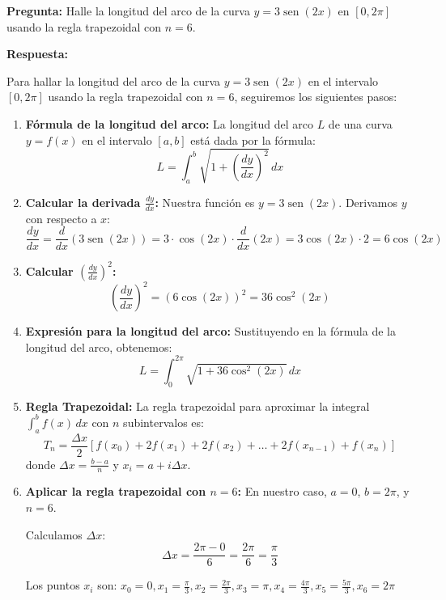 \documentclass{article}
\begin{document}
\textbf{Pregunta:} Halle la longitud del arco de la curva $y = 3\operatorname{sen}(2x)$ en $[0, 2\pi]$ usando la regla trapezoidal con $n = 6$.

\textbf{Respuesta:}

Para hallar la longitud del arco de la curva $y = 3\operatorname{sen}(2x)$ en el intervalo $[0, 2\pi]$ usando la regla trapezoidal con $n = 6$, seguiremos los siguientes pasos:

\begin{enumerate}
    \item \textbf{Fórmula de la longitud del arco:}
    La longitud del arco $L$ de una curva $y = f(x)$ en el intervalo $[a, b]$ está dada por la fórmula:
    $$L = \int_{a}^{b} \sqrt{1 + \left(\frac{dy}{dx}\right)^2} \, dx$$

    \item \textbf{Calcular la derivada $\frac{dy}{dx}$:}
    Nuestra función es $y = 3\operatorname{sen}(2x)$. Derivamos $y$ con respecto a $x$:
    $$\frac{dy}{dx} = \frac{d}{dx} (3\operatorname{sen}(2x)) = 3 \cdot \cos(2x) \cdot \frac{d}{dx}(2x) = 3 \cos(2x) \cdot 2 = 6\cos(2x)$$

    \item \textbf{Calcular $\left(\frac{dy}{dx}\right)^2$:}
    $$\left(\frac{dy}{dx}\right)^2 = (6\cos(2x))^2 = 36\cos^2(2x)$$

    \item \textbf{Expresión para la longitud del arco:}
    Sustituyendo en la fórmula de la longitud del arco, obtenemos:
    $$L = \int_{0}^{2\pi} \sqrt{1 + 36\cos^2(2x)} \, dx$$

    \item \textbf{Regla Trapezoidal:}
    La regla trapezoidal para aproximar la integral $\int_{a}^{b} f(x) \, dx$ con $n$ subintervalos es:
    $$T_n = \frac{\Delta x}{2} \left[ f(x_0) + 2f(x_1) + 2f(x_2) + \dots + 2f(x_{n-1}) + f(x_n) \right]$$
    donde $\Delta x = \frac{b - a}{n}$ y $x_i = a + i\Delta x$.

    \item \textbf{Aplicar la regla trapezoidal con $n = 6$:}
    En nuestro caso, $a = 0$, $b = 2\pi$, y $n = 6$.

    Calculamos $\Delta x$:
    $$\Delta x = \frac{2\pi - 0}{6} = \frac{2\pi}{6} = \frac{\pi}{3}$$

    Los puntos $x_i$ son:
    $x_0 = 0, x_1 = \frac{\pi}{3}, x_2 = \frac{2\pi}{3}, x_3 = \pi, x_4 = \frac{4\pi}{3}, x_5 = \frac{5\pi}{3}, x_6 = 2\pi$


\end{enumerate}
\end{document}
